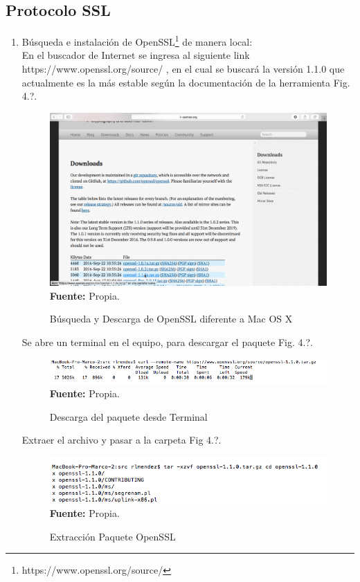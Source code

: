 \documentclass[a4paper,openright,12pt]{book}
\theoremstyle{definition}
\theoremstyle{remark}
\begin{document}
	 \subsection{Protocolo SSL}
\begin{enumerate}
	\item Búsqueda e instalación de OpenSSL\footnote{https://www.openssl.org/source/} de manera local:\\
En el buscador de Internet se ingresa al siguiente link https://www.openssl.org/source/ , en el cual se buscará la versión 1.1.0 que actualmente es la más estable según la documentación de la herramienta Fig. 4.?.

\begin{figure}[h]
\centering
\caption{Búsqueda y Descarga de OpenSSL diferente a Mac OS X} 
\includegraphics[scale=0.3]{1_OpenSSL}
\label{fig:1_OpenSSL}
\\ \textbf{Fuente:} Propia.
\end{figure}

Se abre un terminal en el equipo, para descargar el paquete Fig. 4.?.
\begin{figure}[h]
\centering
\caption{Descarga del paquete desde Terminal} 
\includegraphics[scale=0.7]{2_OpenSSL}
\label{fig:2_OpenSSL}
\\ \textbf{Fuente:} Propia.
\end{figure}

Extraer el archivo y pasar a la carpeta Fig 4.?.
\begin{figure}[h]
\centering
\caption{Extracción Paquete OpenSSL} 
\includegraphics[scale=0.7]{3_OpenSSL}
\label{fig:3_OpenSSL}
\\ \textbf{Fuente:} Propia.
\end{figure}


\end{enumerate}
\end{document}

